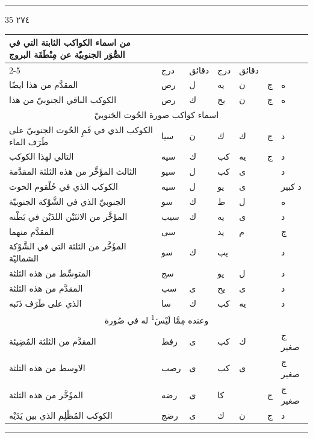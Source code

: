 \documentclass[11pt]{article}
\newcommand{\AbjadZero}{{\NallinoSigns\symbol{"E000}}}
\begin{document}
\par\vspace{3mm}\noindent\rule{40mm}{.4pt}\par\vspace{1mm}{\small 1) Inc. f. 237,r.}
\par\vfill\hfill 35
\clearpage
{\large \textarabic{٢٧٤}}\par\vspace{2mm}
\begin{Arabic}\begin{tabular}{|p{84mm}|>{\centering\arraybackslash}p{9mm}|>{\centering\arraybackslash}p{9mm}|>{\centering\arraybackslash}p{9mm}|>{\centering\arraybackslash}p{9mm}|>{\centering\arraybackslash}p{14mm}|>{\centering\arraybackslash}p{17mm}|}\hline
\multirow{2}{*}{\parbox{80mm}{\centering من اسماء الكواكب الثابتة التي في الصُّوَر الجنوبيّة عن مِنْطَقَة البروج}} & \multicolumn{2}{c|}{الطول} & \multicolumn{2}{c|}{العرض} & \multirow{2}{*}{\parbox{13mm}{\centering\small علامات الجهة}} & \multirow{2}{*}{\parbox{16mm}{\centering\small مراتب العظمة}} \\ \cline{2-5}
 & {\small درج} & {\small دقائق} & {\small درج} & {\small دقائق} & & \\ \hline
المقدَّم من هذا ايضًا & رص & ل & يه & ن & ج & ه \\
الكوكب الباقي الجنوبيّ من هذا & رص & ك & يح & ن & ج & ه \\
\hline
\multicolumn{7}{|c|}{\large اسماء كواكب صورة الحُوت الجَنوبيّ} \\ \hline
الكوكب الذي في فَمِ الحُوت الجنوبيّ على طَرَف الماء & سيا & ن & ك & ك & ج & د \\
التالي لهذا الكوكب & سيه & ك & كب & يه & ج & د \\
الثالث المؤَخَّر من هذه الثلثة المقدَّمة & سيو & ل & كب & ى &  & د \\
الكوكب الذي في حُلْقوم الحوت & سيه & ل & يو & ى &  & د كبير \\
الجنوبيّ الذي في الشَّوْكة الجنوبيّة & سو & ك & ط & ل &  & ه \\
المؤَخَّر من الاثنَيْن اللذَيْن في بَطْنه & سيب & ك & يه & ى &  & د \\
المقدَّم منهما & سى & \AbjadZero{} & يد & م &  & ج \\
المؤَخَّر من الثلثة التي في الشَّوْكة الشماليّة & سو & ك & يب & \AbjadZero{} &  & د \\
المتوسِّط من هذه الثلثة & سج & \AbjadZero{} & يو & ل &  & د \\
المقدَّم من هذه الثلثة & سب & ى & يح & ى &  & د \\
الذي على طَرَف ذَنَبه & سا & ك & كب & يه &  & د \\
\multicolumn{7}{|c|}{وعنده مِمَّا لَيْسَ\textsuperscript{1} له في صُورة} \\
المقدَّم من الثلثة المُضِيئة & رفط & ى & كب & ك &  & ج صغير \\
الاوسط من هذه الثلثة & رصب & ى & كب & ى &  & ج صغير \\
المؤَخَّر من هذه الثلثة & رضه & ى & كا & \AbjadZero{} & ج & ج صغير \\
الكوكب المُظْلِم الذي بين يَدَيْه & رضج & ى & ك & ن & ج & د \\
\hline
\end{tabular}\end{Arabic}
\par\vspace{3mm}\noindent\rule{40mm}{.4pt}\par{}
\end{document}
